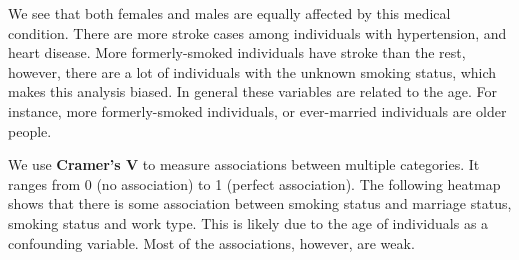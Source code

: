 \documentclass[
]{article}
\begin{document}
We see that both females and males are equally affected by this medical
condition. There are more stroke cases among individuals with
hypertension, and heart disease. More formerly-smoked individuals have
stroke than the rest, however, there are a lot of individuals with the
unknown smoking status, which makes this analysis biased. In general
these variables are related to the age. For instance, more
formerly-smoked individuals, or ever-married individuals are older
people.

We use \textbf{Cramer's V} to measure associations between multiple
categories. It ranges from 0 (no association) to 1 (perfect
association). The following heatmap shows that there is some association
between smoking status and marriage status, smoking status and work
type. This is likely due to the age of individuals as a confounding
variable. Most of the associations, however, are weak.
\end{document}

